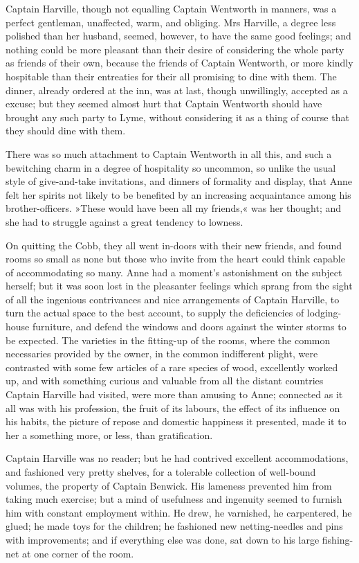 Captain Harville, though not equalling Captain Wentworth in manners, was a perfect gentleman, unaffected, warm, and obliging. Mrs Harville, a degree less polished than her husband, seemed, however, to have the same good feelings; and nothing could be more pleasant than their desire of considering the whole party as friends of their own, because the friends of Captain Wentworth, or more kindly hospitable than their entreaties for their all promising to dine with them. The dinner, already ordered at the inn, was at last, though unwillingly, accepted as a excuse; but they seemed almost hurt that Captain Wentworth should have brought any such party to Lyme, without considering it as a thing of course that they should dine with them.

There was so much attachment to Captain Wentworth in all this, and such a bewitching charm in a degree of hospitality so uncommon, so unlike the usual style of give-and-take invitations, and dinners of formality and display, that Anne felt her spirits not likely to be benefited by an increasing acquaintance among his brother-officers. »These would have been all my friends,« was her thought; and she had to struggle against a great tendency to lowness.

On quitting the Cobb, they all went in-doors with their new friends, and found rooms so small as none but those who invite from the heart could think capable of accommodating so many. Anne had a moment's astonishment on the subject herself; but it was soon lost in the pleasanter feelings which sprang from the sight of all the ingenious contrivances and nice arrangements of Captain Harville, to turn the actual space to the best account, to supply the deficiencies of lodging-house furniture, and defend the windows and doors against the winter storms to be expected. The varieties in the fitting-up of the rooms, where the common necessaries provided by the owner, in the common indifferent plight, were contrasted with some few articles of a rare species of wood, excellently worked up, and with something curious and valuable from all the distant countries Captain Harville had visited, were more than amusing to Anne; connected as it all was with his profession, the fruit of its labours, the effect of its influence on his habits, the picture of repose and domestic happiness it presented, made it to her a something more, or less, than gratification.

Captain Harville was no reader; but he had contrived excellent accommodations, and fashioned very pretty shelves, for a tolerable collection of well-bound volumes, the property of Captain Benwick. His lameness prevented him from taking much exercise; but a mind of usefulness and ingenuity seemed to furnish him with constant employment within. He drew, he varnished, he carpentered, he glued; he made toys for the children; he fashioned new netting-needles and pins with improvements; and if everything else was done, sat down to his large fishing-net at one corner of the room.

